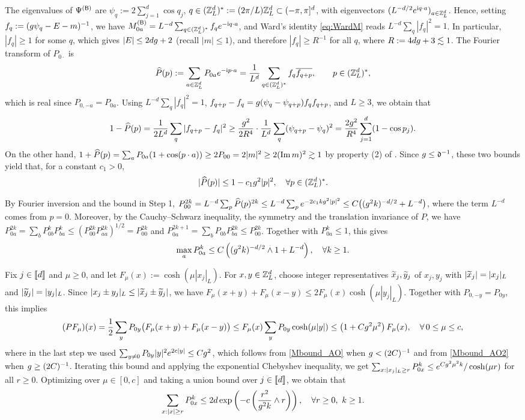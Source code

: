 \smallskip
{} The eigenvalues of $\Psi^{({\mathsf{B}})}$ are $\psi_q:=2\sum_{j=1}^d\cos q_j$, $q\in ({\mathbb Z}_L^d)^*:=(2\pi/L){\mathbb Z}_L^d\subset(-\pi,\pi]^d$, with eigenvectors $(L^{-d/2}e^{\mathrm{i} q\cdot a})_{a\in{\mathbb Z}_L^d}$. Hence, setting $f_q:=(g\psi_q-E-m)^{-1}$, we have $M^{({\mathsf{B}})}_{0a}=L^{-d}\sum_{q\in({\mathbb Z}_L^d)^*}f_qe^{-\mathrm{i} q\cdot a}$, and Ward's identity \eqref{eq:WardM} reads $L^{-d}\sum_q|f_q|^2=1$. In particular, $|f_q|\ge 1$ for some $q$, which gives $|E|\le 2dg+2$ (recall $|m|\le 1$), and therefore $|f_q|\ge R^{-1}$ for all $q$, where $R:=4dg+3\lesssim 1$. The Fourier transform of $P_{0\cdot}$ is 
\[\widehat P(p):=\sum_{a\in{\mathbb Z}_L^d}P_{0a}e^{-\mathrm{i} p\cdot a}=\frac{1}{L^d}\sum_{q\in({\mathbb Z}_L^d)^*} f_q\overline{f_{q+p}},\qquad p\in({\mathbb Z}_L^d)^*,\]
which is real since $P_{0,-a}=P_{0a}$. Using $L^{-d}\sum_q|f_q|^2=1$, $f_{q+p}-f_q=g(\psi_q-\psi_{q+p})f_qf_{q+p}$, and $L\ge 3$, we obtain that
\[1-\widehat P(p)=\frac{1}{2L^d}\sum_q|f_{q+p}-f_q|^2\ge \frac{g^2}{2R^4}\cdot\frac{1}{L^d}\sum_q(\psi_{q+p}-\psi_q)^2=\frac{2g^2}{R^4}\sum_{j=1}^d(1-\cos p_j).\]
On the other hand, $1+\widehat P(p)=\sum_a P_{0a}(1+\cos(p\cdot a))\ge 2P_{00}=2|m|^2\ge 2(\operatorname{{\mathrm{Im}}} m)^2\gtrsim 1$ by property (2) of . Since $g\le{\mathfrak d}^{-1}$, these two bounds yield that, for a constant $c_1>0$,
\[
|\widehat P(p)|\le 1-c_1g^2|p|^2,\quad \forall p\in ({\mathbb Z}_L^d)^*.
\]

\smallskip
{} By Fourier inversion and the bound in Step 1, $P^{2k}_{00}=L^{-d}\sum_{p}\widehat P(p)^{2k}\le L^{-d}\sum_{p}e^{-2c_1kg^2|p|^2}\le C\big((g^2k)^{-d/2}+L^{-d}\big)$, where the term $L^{-d}$ comes from $p=0$. Moreover, by the Cauchy--Schwarz inequality, the symmetry and the translation invariance of $P$, we have $P^{2k}_{0a}=\sum_bP^k_{0b}P^k_{ba}\le (P^{2k}_{00}P^{2k}_{aa})^{1/2}=P^{2k}_{00}$ and $P^{2k+1}_{0a}=\sum_bP_{0b}P^{2k}_{ba}\le P^{2k}_{00}$. Together with $P^k_{0a}\le 1$, this gives
\[
\max_{a}P^k_{0a}\le C\left({(g^2k)^{-d/2}\wedge 1+L^{-d}}\right),\quad \forall k\ge 1. 
\]

\smallskip
{} Fix $j\in\llbracket{d}\rrbracket$ and $\mu\ge 0$, and let $F_\mu(x):=\cosh(\mu|x_j|_L)$. For $x,y\in{\mathbb Z}_L^d$, choose integer representatives $\widetilde x_j,\widetilde y_j$ of $x_j,y_j$ with $|\widetilde x_j|=|x_j|_L$ and $|\widetilde y_j|=|y_j|_L$. Since $|x_j\pm y_j|_L\le |\widetilde x_j\pm \widetilde y_j|$, we have $F_\mu(x+y)+F_\mu(x-y)\le 2F_\mu(x)\cosh(\mu |y_j|_L)$. Together with $P_{0,-y}=P_{0y}$, this implies
\[(PF_\mu)(x)=\frac12\sum_y P_{0y}\big(F_\mu(x+y)+F_\mu(x-y)\big)\le F_\mu(x)\sum_y P_{0y}\cosh(\mu|y|)\le \left({1+Cg^2\mu^2}\right)F_\mu(x),\quad \forall\, 0\le\mu\le c,\]
where in the last step we used $\sum_{y\ne 0}P_{0y}|y|^2e^{2c|y|}\le Cg^2$, which follows from \eqref{Mbound_AO} when $g<(2C)^{-1}$ and from \eqref{Mbound_AO2} when $g\ge (2C)^{-1}$. Iterating this bound and applying the exponential Chebyshev inequality, we get $\sum_{x:|x_j|_L\ge r}P^k_{0x}\le e^{Cg^2\mu^2k}/\cosh(\mu r)$ for all $r\ge 0$. Optimizing over $\mu\in[0,c]$ and taking a union bound over $j\in\llbracket{d}\rrbracket$, we obtain that
\[
\sum_{x:|x|\ge r}P^k_{0x}\le 2d\exp\p{-c\p{\frac{r^2}{\ilambda^2k}\wedge r}},\quad \forall r\ge 0,\ k\ge 1.
\]

